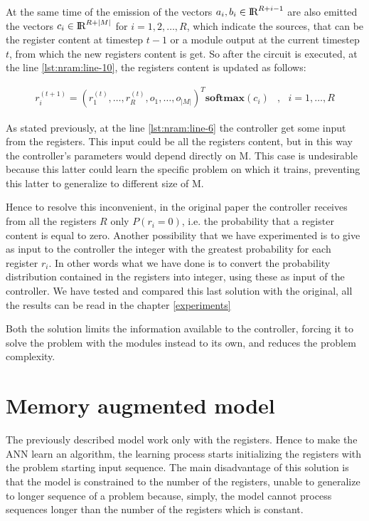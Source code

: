 At the same time of the emission of the vectors $a_{i}, b_{i} \in \textrm{I\!R}^{R+i-1}$ are also emitted the vectors $c_i \in \textrm{I\!R}^{R+|M|}$ for $i = 1, 2, \dots, R$, which indicate the sources, that can be the register content at timestep $t-1$ or a module output at the current timestep $t$, from which the new registers content is get. So after the circuit is executed, at the line \ref{lst:nram:line-10}, the registers content is updated as follows:
\begin{center}
	\begin{equation}
		\begin{split}
			r_i^{(t + 1)} = (r_1^{(t)}, \dots, r_R^{(t)}, o_1, \dots, o_{|M|})^T\textbf{softmax}(c_i) &,\ \ \ i = 1,\dots,R
		\end{split}
	\end{equation}
\end{center}



As stated previously, at the line \ref{lst:nram:line-6} the controller get some input from the registers. This input could be all the registers content, but in this way the controller's parameters would depend directly on M. This case is undesirable because this latter could learn the specific problem on which it trains, preventing this latter to generalize to different size of M. 

Hence to resolve this inconvenient, in the original paper the controller receives from all the registers $R$ only $P(r_{i} = 0)$, i.e. the probability that a register content is equal to zero. Another possibility that we have experimented is to give as input to the controller the integer with the greatest probability for each register $r_{i}$. In other words what we have done is to convert the probability distribution contained in the registers into integer, using these as input of the controller. We have tested and compared this last solution with the original, all the results can be read in the chapter \ref{experiments}

Both the solution limits the information available to the controller, forcing it to solve the problem with the modules instead to its own, and reduces the problem complexity.

\section{Memory augmented model}
The previously described model work only with the registers. Hence to make the ANN learn an algorithm, the learning process starts initializing the registers with the problem starting input sequence. The main disadvantage of this solution is that the model is constrained to the number of the registers, unable to generalize to longer sequence of a problem because, simply, the model cannot process sequences longer than the number of the registers which is constant.

